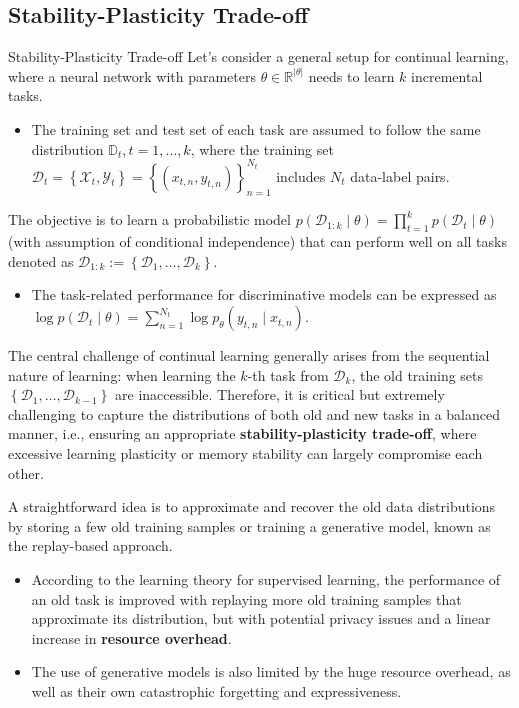 \documentclass[9pt,dvipsnames]{beamer}
\begin{document}
\subsection{Stability-Plasticity Trade-off}
\begin{frame}{Stability-Plasticity Trade-off}
    Let's consider a general setup for continual learning, where a neural network with parameters $\theta \in \mathbb{R}^{|\theta|}$ needs to learn $k$ incremental tasks.
    \begin{itemize}
        \item The training set and test set of each task are assumed to follow the same distribution $\mathbb{D}_{t}, t=1, \ldots, k$, where the training set $\mathcal{D}_{t}=\left\{\mathcal{X}_{t}, \mathcal{Y}_{t}\right\}=\left\{\left(x_{t, n}, y_{t, n}\right)\right\}_{n=1}^{N_{t}}$ includes $N_{t}$ data-label pairs.
    \end{itemize}
    The objective is to learn a probabilistic model $p\left(\mathcal{D}_{1: k} \mid \theta\right)=\prod_{t=1}^{k} p\left(\mathcal{D}_{t} \mid \theta\right)$ (with assumption of conditional independence) that can perform well on all tasks denoted as $\mathcal{D}_{1: k}:=\left\{\mathcal{D}_{1}, \ldots, \mathcal{D}_{k}\right\}$.
    \begin{itemize}
        \item The task-related performance for discriminative models can be expressed as $\log p\left(\mathcal{D}_{t} \mid \theta\right)=\sum_{n=1}^{N_{t}} \log p_{\theta}\left(y_{t, n} \mid x_{t, n}\right)$.
    \end{itemize}
    The central challenge of continual learning generally arises from the sequential nature of learning: when learning the $k$-th task from $\mathcal{D}_{k}$, the old training sets $\left\{\mathcal{D}_{1}, \ldots, \mathcal{D}_{k-1}\right\}$ are inaccessible. Therefore, it is critical but extremely challenging to capture the distributions of both old and new tasks in a balanced manner, i.e., ensuring an appropriate \textbf{stability-plasticity trade-off}, where excessive learning plasticity or memory stability can largely compromise each other.
\end{frame}

\begin{frame}{}
    A straightforward idea is to approximate and recover the old data distributions by storing a few old training samples or training a generative model, known as the replay-based approach.
    \begin{itemize}
        \item According to the learning theory for supervised learning, the performance of an old task is improved with replaying more old training samples that approximate its distribution, but with potential privacy issues and a linear increase in \textbf{resource overhead}.
        \item The use of generative models is also limited by the huge resource overhead, as well as their own catastrophic forgetting and expressiveness.
    \end{itemize}
\end{frame}
\end{document}
